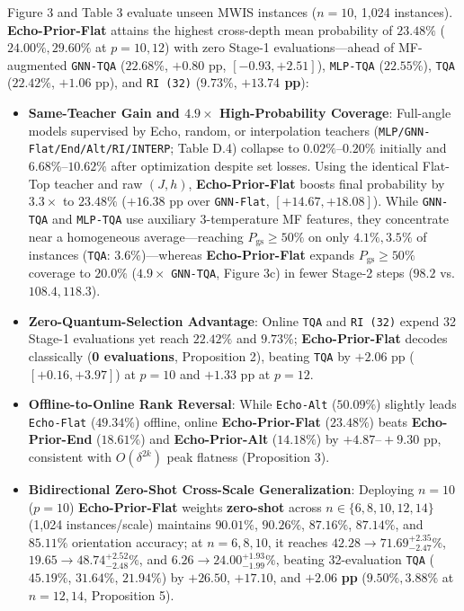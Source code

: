 \documentclass{article}
\theoremstyle{plain}
\theoremstyle{definition}
\begin{document}
Figure 3 and Table 3 evaluate unseen MWIS instances ($n=10$, 1,024 instances). \textbf{Echo-Prior-Flat} attains the highest cross-depth mean probability of $\mathbf{23.48}\%$ ($\mathbf{24.00}\%, \mathbf{29.60}\%$ at $p=10,12$) with zero Stage-1 evaluations---ahead of MF-augmented \texttt{GNN-TQA} ($22.68\%$, $+0.80$ pp, $[-0.93, +2.51]$), \texttt{MLP-TQA} ($22.55\%$), \texttt{TQA} ($22.42\%$, $+1.06$ pp), and \texttt{RI (32)} ($9.73\%$, \textbf{$+13.74$ pp}):

\begin{itemize}\setlength{\itemsep}{0pt}\setlength{\parskip}{1pt}\setlength{\topsep}{1pt}
\item \textbf{Same-Teacher Gain and $4.9\times$ High-Probability Coverage}: Full-angle models supervised by Echo, random, or interpolation teachers (\texttt{MLP/\allowbreak{}GNN-Flat/\allowbreak{}End/\allowbreak{}Alt/\allowbreak{}RI/\allowbreak{}INTERP}; Table D.4) collapse to $0.02\%\text{--}0.20\%$ initially and $6.68\%\text{--}10.62\%$ after optimization despite set losses. Using the identical Flat-Top teacher and raw $(J,h)$, \textbf{Echo-Prior-Flat} boosts final probability by \textbf{$3.3\times$} to $\mathbf{23.48}\%$ ($+16.38$ pp over \texttt{GNN-Flat}, $[+14.67, +18.08]$). While \texttt{GNN-TQA} and \texttt{MLP-TQA} use auxiliary 3-temperature MF features, they concentrate near a homogeneous average---reaching $P_{\mathrm{gs}}\ge 50\%$ on only \textbf{$4.1\%, 3.5\%$} of instances (\texttt{TQA}: \textbf{$3.6\%$})---whereas \textbf{Echo-Prior-Flat} expands $P_{\mathrm{gs}}\ge 50\%$ coverage to \textbf{$\mathbf{20.0}\%$} ($4.9\times$ \texttt{GNN-TQA}, Figure 3c) in fewer Stage-2 steps ($\mathbf{98.2}$ vs. $108.4, 118.3$).
\item \textbf{Zero-Quantum-Selection Advantage}: Online \texttt{TQA} and \texttt{RI (32)} expend 32 Stage-1 evaluations yet reach $22.42\%$ and $9.73\%$; \textbf{Echo-Prior-Flat} decodes classically (\textbf{0 evaluations}, Proposition 2), beating \texttt{TQA} by $+2.06$ pp ($[+0.16, +3.97]$) at $p=10$ and $+1.33$ pp at $p=12$.
\item \textbf{Offline-to-Online Rank Reversal}: While \texttt{Echo-Alt} ($50.09\%$) slightly leads \texttt{Echo-Flat} ($49.34\%$) offline, online \textbf{Echo-Prior-Flat} ($\mathbf{23.48}\%$) beats \textbf{Echo-Prior-End} ($18.61\%$) and \textbf{Echo-Prior-Alt} ($14.18\%$) by $+4.87\text{--}+9.30$ pp, consistent with $O(\delta^{2k})$ peak flatness (Proposition 3).
\item \textbf{Bidirectional Zero-Shot Cross-Scale Generalization}: Deploying $n=10$ ($p=10$) \textbf{Echo-Prior-Flat} weights \textbf{zero-shot} across $n\in\{6,8,10,12,14\}$ (1,024 instances/scale) maintains $\mathbf{90.01}\%$, $\mathbf{90.26}\%$, $\mathbf{87.16}\%$, $\mathbf{87.14}\%$, and $\mathbf{85.11}\%$ orientation accuracy; at $n=6,8,10$, it reaches $42.28\rightarrow\allowbreak \mathbf{71.69}^{+2.35}_{-2.47}\%$, $19.65\rightarrow\allowbreak \mathbf{48.74}^{+2.52}_{-2.48}\%$, and $6.26\rightarrow\allowbreak \mathbf{24.00}^{+1.93}_{-1.99}\%$, beating 32-evaluation \texttt{TQA} ($45.19\%$, $31.64\%$, $21.94\%$) by $\mathbf{+26.50}$, $\mathbf{+17.10}$, and $\mathbf{+2.06}$ \textbf{pp} ($9.50\%, 3.88\%$ at $n=12, 14$, Proposition 5).

\end{itemize}
\end{document}
